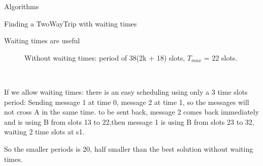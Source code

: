 \documentclass[a4paper,10pt]{report}
\begin{document}
\begin{chapter}{Algorithms}
\begin{section}{Finding a TwoWayTrip with waiting times}
\begin{subsection}{Waiting times are useful}
\begin{center}
{{\begin{figure}[H]
\begin{center}
{
  } 
  \caption{Without waiting times: period of 38(2k + 18) slots, $T_{max}$ = 22 slots.}
 
\end{center}
\end{figure}
}}\\
\end{center}



If we allow waiting times: there is an easy scheduling using only a 3 time slots period: 
Sending message 1 at time 0, message 2 at time 1, so the messages will not cross A in the same time. to be sent back,
message 2 comes back immediately and is using B from slots 13 to 22,then message 1 is using B from slots 23 to 32, waiting 2 time slots at s1.

So the smaller periods is 20, half smaller than the best solution without waiting times.\\



\end{subsection}
\end{section}
\end{chapter}
\end{document}
